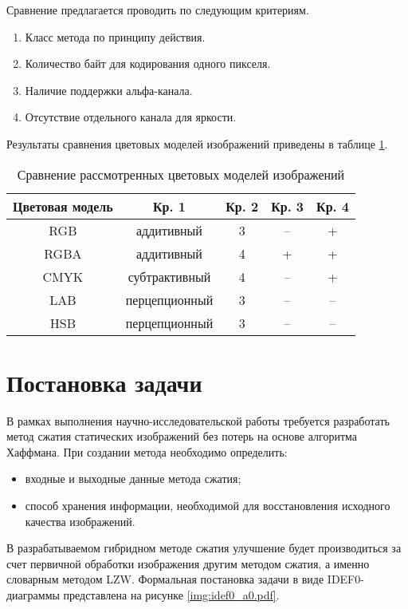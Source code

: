 Сравнение предлагается проводить по следующим критериям.
\begin{enumerate}
    \item Класс метода по принципу действия.
    \item Количество байт для кодирования одного пикселя.
    \item Наличие поддержки альфа-канала.
    \item Отсутствие отдельного канала для яркости.
\end{enumerate}

Результаты сравнения цветовых моделей изображений приведены в таблице \ref{tbl:color_models}.
\begin{table}[H]
    \centering
	\caption{Сравнение рассмотренных цветовых моделей изображений}
    \label{tbl:color_models}
	\begin{tabular}{|c|c|c|c|c|}
        \hline
        \textbf{Цветовая модель} & \textbf{Кр. 1} & \textbf{Кр. 2} & \textbf{Кр. 3} & \textbf{Кр. 4} \\ \hline
        RGB   & аддитивный    & 3 & -- & +  \\ \hline
        RGBA  & аддитивный    & 4 & +  & +  \\ \hline
        CMYK  & субтрактивный & 4 & -- & +  \\ \hline
        LAB   & перцепционный & 3 & -- & -- \\ \hline
        HSB   & перцепционный & 3 & -- & -- \\ \hline
    \end{tabular}
\end{table}

\section{Постановка задачи}

В рамках выполнения научно-исследовательской работы требуется разработать метод сжатия статических изображений без потерь на основе алгоритма Хаффмана. При создании метода необходимо определить:
\begin{itemize}
    \item входные и выходные данные метода сжатия;
    \item способ хранения информации, необходимой для восстановления исходного качества изображений.
\end{itemize}

В разрабатываемом гибридном методе сжатия улучшение будет производиться за счет первичной обработки изображения другим методом сжатия, а именно словарным методом LZW. Формальная постановка задачи в виде IDEF0-диаграммы представлена на рисунке \ref{img:idef0_a0.pdf}.

